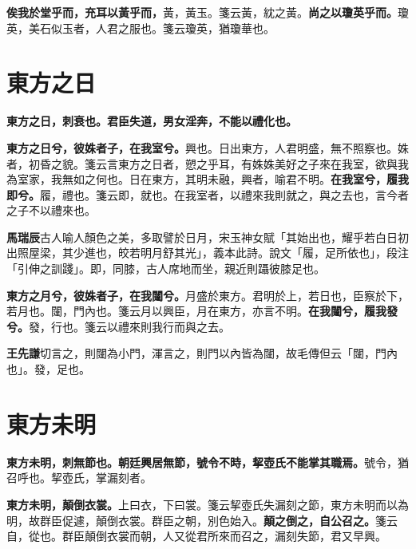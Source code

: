 \textbf{俟我於堂乎而，充耳以黃乎而，}{\footnotesize 黃，黃玉。箋云黃，紞之黃。}\textbf{尚之以瓊英乎而。}{\footnotesize 瓊英，美石似玉者，人君之服也。箋云瓊英，猶瓊華也。}

\section{東方之日}


\textbf{東方之日，刺衰也。君臣失道，男女淫奔，不能以禮化也。}

\textbf{東方之日兮，彼姝者子，在我室兮。}{\footnotesize 興也。日出東方，人君明盛，無不照察也。姝者，初昏之貌。箋云言東方之日者，愬之乎耳，有姝姝美好之子來在我室，欲與我為室家，我無如之何也。日在東方，其明未融，興者，喻君不明。}\textbf{在我室兮，履我即兮。}{\footnotesize 履，禮也。箋云即，就也。在我室者，以禮來我則就之，與之去也，言今者之子不以禮來也。}

\begin{quoting}\textbf{馬瑞辰}古人喻人顏色之美，多取譬於日月，宋玉神女賦「其始出也，耀乎若白日初出照屋梁，其少進也，皎若明月舒其光」，義本此詩。說文「履，足所依也」，段注「引伸之訓踐」。即，同膝，古人席地而坐，親近則躡彼膝足也。\end{quoting}

\textbf{東方之月兮，彼姝者子，在我闥兮。}{\footnotesize 月盛於東方。君明於上，若日也，臣察於下，若月也。闥，門內也。箋云月以興臣，月在東方，亦言不明。}\textbf{在我闥兮，履我發兮。}{\footnotesize 發，行也。箋云以禮來則我行而與之去。}

\begin{quoting}\textbf{王先謙}切言之，則闥為小門，渾言之，則門以內皆為闥，故毛傳但云「闥，門內也」。發，足也。\end{quoting}

\section{東方未明}


\textbf{東方未明，刺無節也。朝廷興居無節，號令不時，挈壺氏不能掌其職焉。}{\footnotesize 號令，猶召呼也。挈壺氏，掌漏刻者。}

\textbf{東方未明，顛倒衣裳。}{\footnotesize 上曰衣，下曰裳。箋云挈壺氏失漏刻之節，東方未明而以為明，故群臣促遽，顛倒衣裳。群臣之朝，別色始入。}\textbf{顛之倒之，自公召之。}{\footnotesize 箋云自，從也。群臣顛倒衣裳而朝，人又從君所來而召之，漏刻失節，君又早興。}

